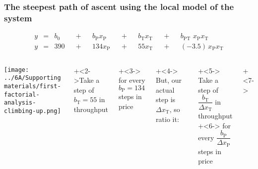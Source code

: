 \begin{frame}\frametitle{The steepest {\color{myOrange}path of ascent} using the local model of the system}

	\begin{exampleblock}{}
		\begin{align*} 
			y &=& b_0 &&+&& b_\text{P} x_\text{P} &&+&& b_\text{T} x_\text{T} &&+&& b_\text{PT}\,\,x_\text{P}x_\text{T} \\
			y &=& 390 &&+&& 134 x_\text{P}        &&+&& 55 x_\text{T}         &&+&& (-3.5)\,x_\text{P}x_\text{T} 
		\end{align*}		
	\end{exampleblock}
	
	\begin{columns}[c]
			\centerline{\texttt{[image: ../6A/Supporting materials/first-factorial-analysis-climbing-up.png]}}
		
			
			\vspace{.1cm}\onslide+<2->{\color{myGreen}Take a step of $b_\text{T}=55$ in throughput\\}
			
			\onslide+<3->{
				\color{myGreen}for every $b_\text{P}=134$ steps in price
			}
			
			\vspace{.3cm}
			\onslide+<4->{
				\color{myOrange}But, our actual step is $\Delta x_\text{T}$, so ratio it:
			}
			
			\vspace{.3cm}
			\onslide+<5->{
				\color{myGreen}Take a step of $\dfrac{b_\text{T}}{\Delta x_\text{T}}$ in throughput\\  
			}
			\onslide+<6->{
				\color{myGreen}for every $\dfrac{b_\text{P}}{\Delta x_\text{P}}$ steps in price
			}
			\vspace{0.3cm}
		
	   	 
			\onslide+<7->{
			}
		   	 
	\end{columns}
\end{frame}

